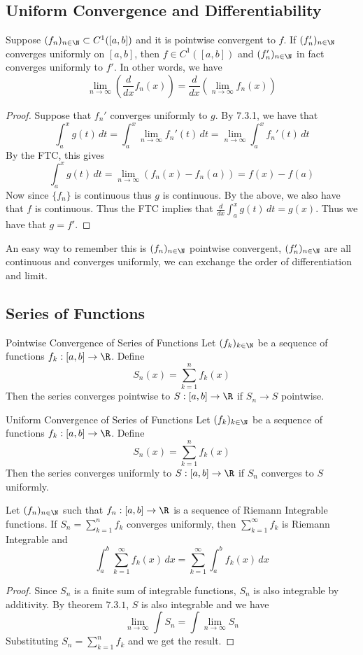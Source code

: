 \subsection{Uniform Convergence and Differentiability}
\begin{thm}{}{} Suppose $(f_n)_{n\in\N}\subset C^1([a,b])$ and it is pointwise convergent to $f$. If $(f_n')_{n\in\N}$ converges uniformly on $[a,b]$, then $f\in C^1([a,b])$ and $(f_n')_{n\in\N}$ in fact converges uniformly to $f'$. In other words, we have $$\lim_{n\to\infty}\left(\frac{d}{dx}f_n(x)\right)=\frac{d}{dx}\left(\lim_{n\to\infty}f_n(x)\right)$$ \tcbline
\begin{proof} Suppose that $f_n'$ converges uniformly to $g$. By 7.3.1, we have that $$\int_a^xg(t)\,dt=\int_a^x\lim_{n\to\infty}f_n'(t)\,dt=\lim_{n\to\infty}\int_a^xf_n'(t)\,dt$$
By the FTC, this gives $$\int_a^xg(t)\,dt=\lim_{n\to\infty}(f_n(x)-f_n(a))=f(x)-f(a)$$
Now since $\{f_n\}$ is continuous thus $g$ is continuous. By the above, we also have that $f$ is continuous. Thus the FTC implies that $\frac{d}{dx}\int_a^xg(t)\,dt=g(x)$. Thus we have that $g=f'$. 
\end{proof}
\end{thm}

An easy way to remember this is $(f_n)_{n\in\N}$ pointwise convergent, $(f_n')_{n\in\N}$ are all continuous and converges uniformly, we can exchange the order of differentiation and limit. 

\subsection{Series of Functions}
\begin{defn}{Pointwise Convergence of Series of Functions}{} Let $(f_k)_{k\in\N}$ be a sequence of functions $f_k:[a,b]\to\R$. Define $$S_n(x)=\sum_{k=1}^nf_k(x)$$ Then the series converges pointwise to $S:[a,b]\to\R$ if $S_n\to S$ pointwise. 
\end{defn}

\begin{defn}{Uniform Convergence of Series of Functions}{} Let $(f_k)_{k\in\N}$ be a sequence of functions $f_k:[a,b]\to\R$. Define $$S_n(x)=\sum_{k=1}^nf_k(x)$$ Then the series converges uniformly to $S:[a,b]\to\R$ if $S_n$ converges to $S$ uniformly.  
\end{defn}

\begin{thm}{}{} Let $(f_n)_{n\in\N}$ such that $f_n:[a,b]\to\R$ is a sequence of Riemann Integrable functions. If $S_n=\sum_{k=1}^nf_k$ converges uniformly, then $\sum_{k=1}^\infty f_k$ is Riemann Integrable and $$\int_a^b\sum_{k=1}^\infty f_k(x)\,dx=\sum_{k=1}^\infty\int_a^bf_k(x)\,dx$$ \tcbline
\begin{proof} Since $S_n$ is a finite sum of integrable functions, $S_n$ is also integrable by additivity. By theorem $7.3.1$, $S$ is also integrable and we have $$\lim_{n\to\infty}\int S_n=\int\lim_{n\to\infty}S_n$$ Substituting $S_n=\sum_{k=1}^nf_k$ and we get the result. 
\end{proof}
\end{thm}


